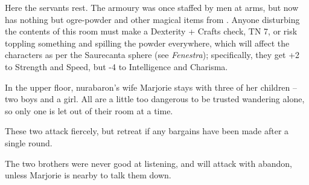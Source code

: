
Here the servants rest.
The armoury was once staffed by men at arms, but now has nothing but ogre-powder and other magical items from .
Anyone disturbing the contents of this room must make a Dexterity + Crafts check, TN 7, or risk toppling something and spilling the powder everywhere, which will affect the characters as per the Saurecanta sphere (see \textit{Fenestra}\iftoggle{aif}{\autopageref{saurecanta}}{});
specifically, they get +2 to Strength and Speed, but -4 to Intelligence and Charisma.


In the upper floor, \gls{nurabaron}'s wife Marjorie stays with three of her children -- two boys and a girl.
All are a little too dangerous to be trusted wandering alone, so only one is let out of their room at a time.

These two attack fiercely, but retreat if any bargains have been made after a single round.

The two brothers were never good at listening, and will attack with abandon, unless Marjorie is nearby to talk them down.



